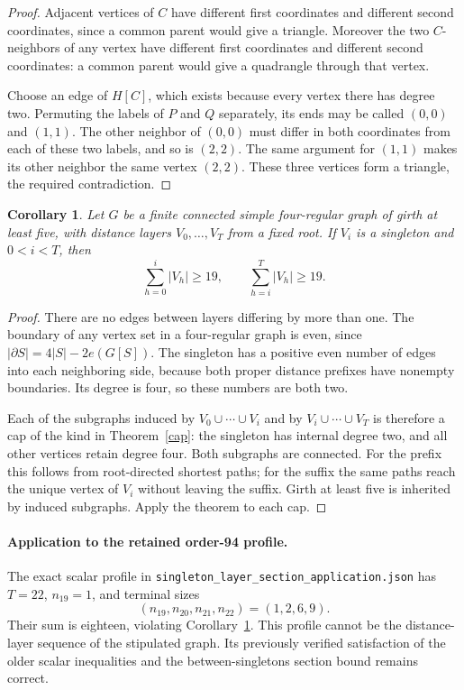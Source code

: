 \documentclass[11pt]{article}
\newtheorem{corollary}{Corollary}
\begin{document}
\begin{proof}
Adjacent vertices of $C$ have different first coordinates and different
second coordinates, since a common parent would give a triangle.
Moreover the two $C$-neighbors of any vertex have different first
coordinates and different second coordinates: a common parent would
give a quadrangle through that vertex.

Choose an edge of $H[C]$, which exists because every vertex there
has degree two. Permuting the labels of $P$ and $Q$ separately, its
ends may be called $(0,0)$ and $(1,1)$. The other neighbor of $(0,0)$
must differ in both coordinates from each of these two labels, and
so is $(2,2)$. The same argument for $(1,1)$ makes its other neighbor
the same vertex $(2,2)$. These three vertices form a triangle, the
required contradiction.
\end{proof}

\begin{corollary}\label{layer}
Let $G$ be a finite connected simple four-regular graph of girth at
least five, with distance layers $V_0,\ldots,V_T$ from a fixed root.
If $V_i$ is a singleton and $0<i<T$, then
\[
 \sum_{h=0}^{i}|V_h|\geq19,
 \qquad
 \sum_{h=i}^{T}|V_h|\geq19.
\]
\end{corollary}
\begin{proof}
There are no edges between layers differing by more than one. The
boundary of any vertex set in a four-regular graph is even, since
$|\partial S|=4|S|-2e(G[S])$. The singleton has a positive even
number of edges into each neighboring side, because both proper
distance prefixes have nonempty boundaries. Its degree is four,
so these numbers are both two.

Each of the subgraphs induced by $V_0\cup\cdots\cup V_i$ and by
$V_i\cup\cdots\cup V_T$ is therefore a cap of the kind in
Theorem~\ref{cap}: the singleton has internal degree two, and all
other vertices retain degree four. Both subgraphs are connected.
For the prefix this follows from root-directed shortest paths; for
the suffix the same paths reach the unique vertex of $V_i$ without
leaving the suffix. Girth at least five is inherited by induced
subgraphs. Apply the theorem to each cap.
\end{proof}

\paragraph{Application to the retained order-94 profile.}
The exact scalar profile in
\texttt{singleton\_layer\_section\_application.json} has $T=22$,
$n_{19}=1$, and terminal sizes
\[
 (n_{19},n_{20},n_{21},n_{22})=(1,2,6,9).
\]
Their sum is eighteen, violating Corollary~\ref{layer}. This profile
cannot be the distance-layer sequence of the stipulated graph. Its
previously verified satisfaction of the older scalar inequalities
and the between-singletons section bound remains correct.
\end{document}
